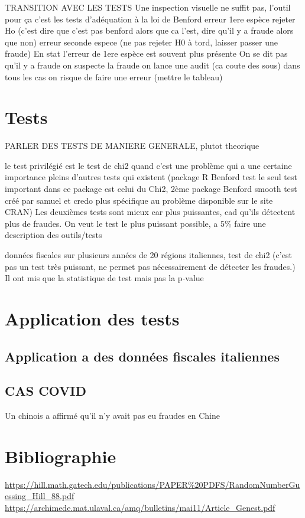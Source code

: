 \documentclass[
  12pt,
]{article}
\begin{document}
TRANSITION AVEC LES TESTS Une inspection visuelle ne suffit pas, l'outil
pour ça c'est les tests d'adéquation à la loi de Benford erreur 1ere
espèce rejeter Ho (c'est dire que c'est pas benford alors que ca l'est,
dire qu'il y a fraude alors que non) erreur seconde espece (ne pas
rejeter H0 à tord, laisser passer une fraude) En stat l'erreur de 1ere
espèce est souvent plus présente On se dit pas qu'il y a fraude on
suspecte la fraude on lance une audit (ca coute des sous) dans tous les
cas on risque de faire une erreur (mettre le tableau)

\hypertarget{tests}{%
\section{Tests}\label{tests}}

PARLER DES TESTS DE MANIERE GENERALE, plutot theorique

le test privilégié est le test de chi2 quand c'est une problème qui a
une certaine importance pleins d'autres tests qui existent (package R
Benford test le seul test important dans ce package est celui du Chi2,
2ème package Benford smooth test créé par samuel et credo plus
spécifique au problème disponible sur le site CRAN) Les deuxièmes tests
sont mieux car plus puissantes, cad qu'ils détectent plus de fraudes. On
veut le test le plus puissant possible, a 5\% faire une description des
outils/tests

données fiscales sur plusieurs années de 20 régions italiennes, test de
chi2 (c'est pas un test très puissant, ne permet pas nécessairement de
détecter les fraudes.) Il ont mis que la statistique de test mais pas la
p-value

\hypertarget{application-des-tests}{%
\section{Application des tests}\label{application-des-tests}}

\hypertarget{application-a-des-donnuxe9es-fiscales-italiennes}{%
\subsection{Application a des données fiscales
italiennes}\label{application-a-des-donnuxe9es-fiscales-italiennes}}

\hypertarget{cas-covid}{%
\subsection{CAS COVID}\label{cas-covid}}

Un chinois a affirmé qu'il n'y avait pas eu fraudes en Chine

\hypertarget{bibliographie}{%
\section{Bibliographie}\label{bibliographie}}

\url{https://hill.math.gatech.edu/publications/PAPER\%20PDFS/RandomNumberGuessing_Hill_88.pdf}
\url{https://archimede.mat.ulaval.ca/amq/bulletins/mai11/Article_Genest.pdf}
\end{document}
